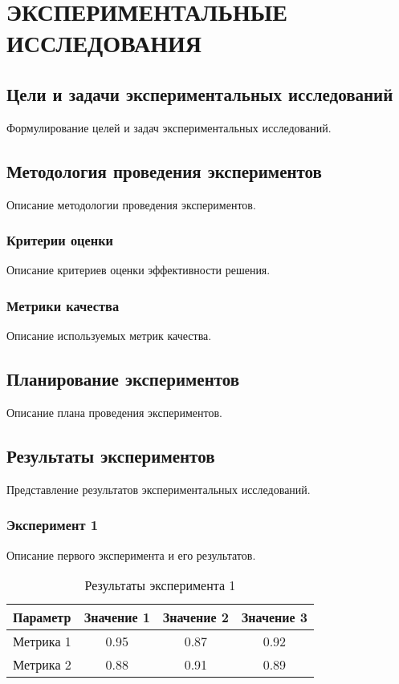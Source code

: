 \chapter{ЭКСПЕРИМЕНТАЛЬНЫЕ ИССЛЕДОВАНИЯ}

\section{Цели и задачи экспериментальных исследований}

Формулирование целей и задач экспериментальных исследований.

\section{Методология проведения экспериментов}

Описание методологии проведения экспериментов.

\subsection{Критерии оценки}

Описание критериев оценки эффективности решения.

\subsection{Метрики качества}

Описание используемых метрик качества.

\section{Планирование экспериментов}

Описание плана проведения экспериментов.

\section{Результаты экспериментов}

Представление результатов экспериментальных исследований.

\subsection{Эксперимент 1}

Описание первого эксперимента и его результатов.

\begin{table}[H]
\centering
\caption{Результаты эксперимента 1}
\begin{tabular}{|l|c|c|c|}
\hline
Параметр & Значение 1 & Значение 2 & Значение 3 \\
\hline
Метрика 1 & 0.95 & 0.87 & 0.92 \\
Метрика 2 & 0.88 & 0.91 & 0.89 \\
\hline
\end{tabular}
\label{tab:exp1}
\end{table}

